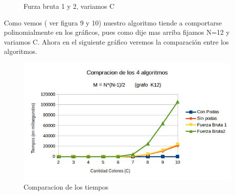  \begin{figure}
 \centering
 \caption{Furza bruta 1 y 2, variamos C}
 \label{tiempos}
\end{figure}


Como vemos ( ver figura 9 y 10) nuestro algoritmo tiende a comportarse polinomialmente en los gráficos, pues como dije mas arriba fijamos N=12 y variamos C. 
Ahora en el siguiente gráfico veremos la comparación  entre los algoritmos.

\newpage

\begin{figure}[htb]
  \begin{center}
      \includegraphics[scale=0.60]{imagenes/imgEjercicio2/ComparacionVariaC.jpg}
  \end{center}
  \caption{Comparacion de los tiempos}
\end{figure}



